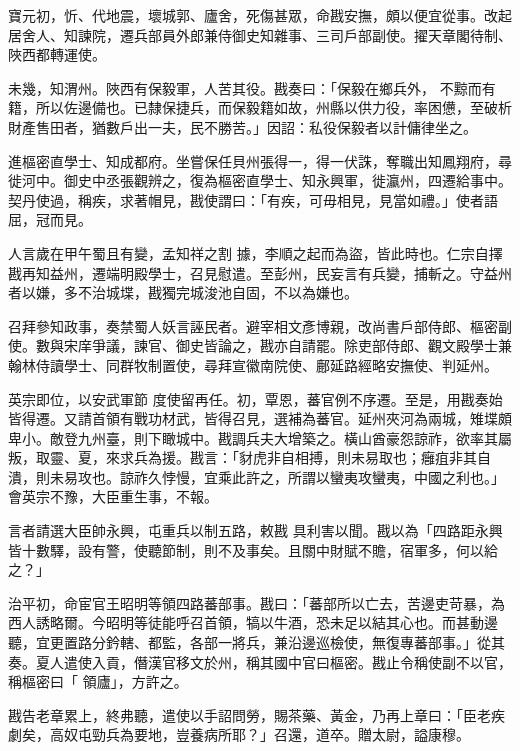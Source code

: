 \begin{pinyinscope}
 寶元初，忻、代地震，壞城郭、廬舍，死傷甚眾，命戡安撫，頗以便宜從事。改起居舍人、知諫院，遷兵部員外郎兼侍御史知雜事、三司戶部副使。擢天章閣待制、陜西都轉運使。



 未幾，知渭州。陜西有保毅軍，人苦其役。戡奏曰：「保毅在鄉兵外，
 不黥而有籍，所以佐邊備也。已隸保捷兵，而保毅籍如故，州縣以供力役，率困憊，至破析財產售田者，猶數戶出一夫，民不勝苦。」因詔：私役保毅者以計傭律坐之。



 進樞密直學士、知成都府。坐嘗保任貝州張得一，得一伏誅，奪職出知鳳翔府，尋徙河中。御史中丞張觀辨之，復為樞密直學士、知永興軍，徙瀛州，四遷給事中。契丹使過，稱疾，求著帽見，戡使謂曰：「有疾，可毋相見，見當如禮。」使者語屈，冠而見。



 人言歲在甲午蜀且有變，孟知祥之割
 據，李順之起而為盜，皆此時也。仁宗自擇戡再知益州，遷端明殿學士，召見慰遣。至彭州，民妄言有兵變，捕斬之。守益州者以嫌，多不治城堞，戡獨完城浚池自固，不以為嫌也。



 召拜參知政事，奏禁蜀人妖言誣民者。避宰相文彥博親，改尚書戶部侍郎、樞密副使。數與宋庠爭議，諫官、御史皆論之，戡亦自請罷。除吏部侍郎、觀文殿學士兼翰林侍讀學士、同群牧制置使，尋拜宣徽南院使、鄜延路經略安撫使、判延州。



 英宗即位，以安武軍節
 度使留再任。初，覃恩，蕃官例不序遷。至是，用戡奏始皆得遷。又請首領有戰功材武，皆得召見，選補為蕃官。延州夾河為兩城，雉堞頗卑小。敵登九州臺，則下瞰城中。戡調兵夫大增築之。橫山酋豪怨諒祚，欲率其屬叛，取靈、夏，來求兵為援。戡言：「豺虎非自相搏，則未易取也；癰疽非其自潰，則未易攻也。諒祚久悖慢，宜乘此許之，所謂以蠻夷攻蠻夷，中國之利也。」會英宗不豫，大臣重生事，不報。



 言者請選大臣帥永興，屯重兵以制五路，敕戡
 具利害以聞。戡以為「四路距永興皆十數驛，設有警，使聽節制，則不及事矣。且關中財賦不贍，宿軍多，何以給之？」



 治平初，命宦官王昭明等領四路蕃部事。戡曰：「蕃部所以亡去，苦邊吏苛暴，為西人誘略爾。今昭明等徒能呼召首領，犒以牛酒，恐未足以結其心也。而甚動邊聽，宜更置路分鈐轄、都監，各部一將兵，兼沿邊巡檢使，無復專蕃部事。」從其奏。夏人遣使入貢，僭漢官移文於州，稱其國中官曰樞密。戡止令稱使副不以官，稱樞密曰「
 領廬」，方許之。



 戡告老章累上，終弗聽，遣使以手詔問勞，賜茶藥、黃金，乃再上章曰：「臣老疾劇矣，高奴屯勁兵為要地，豈養病所耶？」召還，道卒。贈太尉，謚康穆。




\end{pinyinscope}
